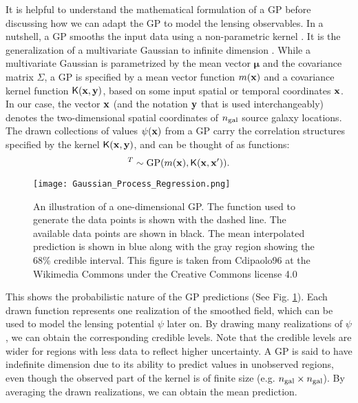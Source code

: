 It is helpful to understand the mathematical formulation of a GP 
before discussing how we can adapt the GP to model the lensing observables. 
In a nutshell, a GP smooths the input data using a non-parametric kernel
\citep{Hastie1990}. 
It is the generalization of a multivariate Gaussian 
to infinite dimension \citep{Rasmussen2006}. 
While a multivariate Gaussian is parametrized by  
the mean vector $\mathbf{\mu}$ and the covariance matrix $\Sigma$, 
a GP is specified by a mean vector function $m(\mathbf{x})$ and a
covariance kernel function $\mathsf{K}(\mathbf{x}, \mathbf{y})$, based on some input spatial or
temporal coordinates $\mathbf{x}$. In our case, the vector $\mathbf{x}$ (and the
 notation $\mathbf{y}$ that is used interchangeably) denotes the
two-dimensional spatial coordinates of $n_{\rm gal}$ source galaxy locations. 
The drawn collections of values $\psi(\mathbf{x})$ from a GP carry the correlation structures
specified by the kernel $\mathsf{K}(\mathbf{x}, \mathbf{y})$, and can be thought of as
functions: 
\begin{equation}
		[\psi_1(\xv), \psi_2(\xv) \ldots, \psi_m(\xv) ]^T \sim \gp(m(\xv), \kerngp(\xv, \xv')).
		\label{eq:GP}
\end{equation}
\begin{figure}
	\centering
	\texttt{[image: Gaussian\_Process\_Regression.png]}
	\caption{An illustration of a one-dimensional GP. The
		function used to generate the data points 
		is shown with the dashed line. The available data points are shown in
		black. The mean interpolated prediction is shown in blue
		along with the gray region showing the 68\% 
		credible interval. This figure is taken from Cdipaolo96 at 
		the Wikimedia Commons under the Creative Commons license 4.0
\label{fig:one_d_gaussian_process}}
\end{figure}
This shows the probabilistic nature of the GP predictions
(See Fig. \ref{fig:one_d_gaussian_process}).
Each drawn function represents one realization of the smoothed
field, which can be used to model the lensing potential $\psi$ later on. 
By drawing many realizations of $\psi$, we can obtain the
corresponding credible levels.
Note that the credible levels are wider for regions with less data to reflect
higher uncertainty. A GP is said to have indefinite dimension due to its ability to
predict values in unobserved regions, even though the 
observed part of the kernel is of finite size (e.g. $n_{\rm gal} \times n_{\rm gal}$). 
By averaging the drawn realizations, we can
obtain the mean prediction. 


